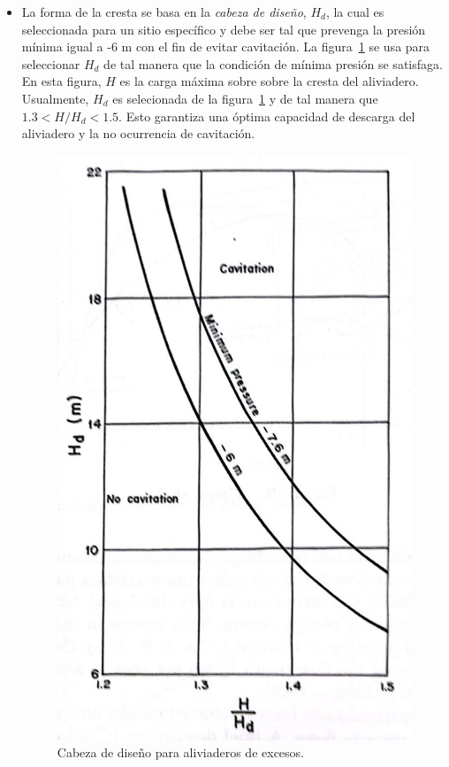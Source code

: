 \documentclass[11pt, oneside]{article}
\begin{document}
\begin{itemize}
\item La forma de la cresta se basa en la  \emph{cabeza de diseño}, $H_d$, la cual es seleccionada para un sitio espec\'ifico y debe ser tal que prevenga la presi\'on m\'inima igual a -6 m con el fin de evitar cavitaci\'on. La figura~\ref{fig718} se usa para seleccionar $H_d$ de tal manera que la condici\'on de m\'inima presi\'on se satisfaga. En esta figura, $H$ es la carga m\'axima sobre sobre la cresta del aliviadero. Usualmente, $H_d$ es selecionada de la  figura~\ref{fig718} y de tal manera que  $1.3< H/H_d < 1.5$. Esto garantiza una \'optima capacidad de descarga del aliviadero y la no ocurrencia de cavitaci\'on. 
\begin{figure}[h]
    \centering
    \includegraphics[width=0.8\linewidth]{fig718.jpeg}
    \caption{Cabeza de diseño para aliviaderos de excesos.}
    \label{fig718}
\end{figure}


\end{itemize}
\end{document}
